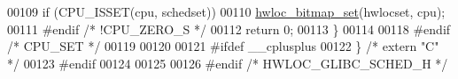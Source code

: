 \begin{DoxyCode}
00109     \textcolor{keywordflow}{if} (CPU\_ISSET(cpu, schedset))
00110       \hyperlink{a00205_ga062dbff93baeff3b425a7260c5463646}{hwloc\_bitmap\_set}(hwlocset, cpu);
00111 \textcolor{preprocessor}{#endif }\textcolor{comment}{/* !CPU\_ZERO\_S */}\textcolor{preprocessor}{}
00112   \textcolor{keywordflow}{return} 0;
00113 \}
00114 
00118 \textcolor{preprocessor}{#endif }\textcolor{comment}{/* CPU\_SET */}\textcolor{preprocessor}{}
00119 
00120 
00121 \textcolor{preprocessor}{#ifdef \_\_cplusplus}
00122 \} \textcolor{comment}{/* extern "C" */}
00123 \textcolor{preprocessor}{#endif}
00124 
00125 
00126 \textcolor{preprocessor}{#endif }\textcolor{comment}{/* HWLOC\_GLIBC\_SCHED\_H */}\textcolor{preprocessor}{}
\end{DoxyCode}
